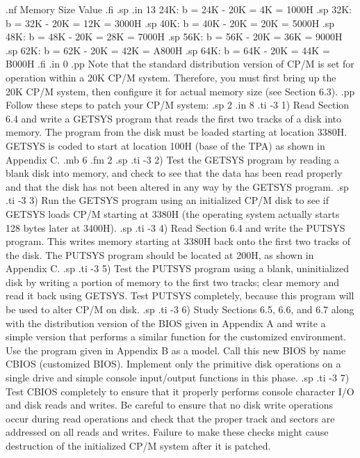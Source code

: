 .nf
          Memory Size                Value
.fi
.sp
.in 13
24K:         b = 24K - 20K =  4K = 1000H
.sp
32K:         b = 32K - 20K = 12K = 3000H
.sp
40K:         b = 40K - 20K = 20K = 5000H
.sp
48K:         b = 48K - 20K = 28K = 7000H
.sp
56K:         b = 56K - 20K = 36K = 9000H
.sp
62K:         b = 62K - 20K = 42K = A800H
.sp
64K:         b = 64K - 20K = 44K = B000H
.fi
.in 0
.pp
Note that the standard distribution version of CP/M is set for 
operation within a 20K CP/M system. Therefore, you must first bring up 
the 20K CP/M system, then configure it for actual 
memory size (see Section 6.3).
.pp
Follow these steps to patch your CP/M system:
.sp 2
.in 8
.ti -3
1) Read Section 6.4 and write a GETSYS program that reads the 
first two tracks of a disk into memory.  The program from the 
disk must be loaded starting at location 3380H.  GETSYS is coded 
to start at location 100H (base of the TPA) as shown in Appendix 
C.
.mb 6
.fm 2
.sp
.ti -3
2) Test the GETSYS program by reading a blank disk into memory, 
and check to see that the data has been read properly and that 
the disk has not been altered in any way by the GETSYS program.
.sp
.ti -3
3) Run the GETSYS program using an initialized CP/M disk to see 
if GETSYS loads CP/M starting at 3380H (the operating system 
actually starts 128 bytes later at 3400H).
.sp
.ti -3
4) Read Section 6.4 and write the PUTSYS program.  This writes 
memory starting at 3380H back onto the first two tracks of the 
disk.  The PUTSYS program should be located at 200H, as shown in 
Appendix C.
.sp 
.ti -3
5) Test the PUTSYS program using a blank, uninitialized disk by 
writing a portion of memory to the first two tracks; clear memory 
and read it back using GETSYS.  Test PUTSYS completely, because 
this program will be used to alter CP/M on disk.
.sp
.ti -3
6) Study Sections 6.5, 6.6, and 6.7 along with the distribution 
version of the BIOS given in Appendix A and write a simple 
version that performs a similar function for the customized 
environment.  Use the program given in Appendix B as a model.  
Call this new BIOS by name CBIOS (customized BIOS).  Implement 
only the primitive disk operations on a single drive and simple 
console input/output functions in this phase.
.sp
.ti -3
7) Test CBIOS completely to ensure that it properly performs 
console character I/O and disk reads and writes.  Be careful to 
ensure that no disk write operations occur during read operations 
and check that the proper track and sectors are addressed on all 
reads and writes.  Failure to make these checks might cause 
destruction of the initialized CP/M system after it is patched.
